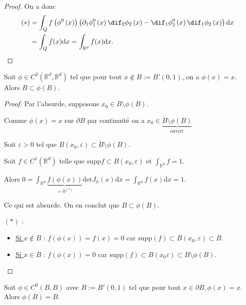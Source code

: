 \begin{proof}
	On a donc 
	\begin{align*}
		\left( * \right) &= \int_Q f\left( \phi^0 \left(x  \right) \right) \left( \partial_1 \phi_{1}^0\left( x \right) \dif_2 \phi_2 \left( x \right) - \dif_1 \phi^0_2\left(x  \right) \dif_1 \phi_2 \left( x \right) \right) \mathrm{d} x\\
		&= \int_Q f(x) \mathrm{d} x = \int_{\mathbb{R}^d}f(x) \dd x 
	.\end{align*}
\end{proof} 
\begin{corollaire}
	Soit $\phi \in C^2 \left( \mathbb{R}^d, \mathbb{R}^d \right) $ tel que pour tout $x \not\in B := B'\left( 0,1 \right)$, on a $\phi\left( x \right) =x$. Alors $B \subset \phi\left( B \right) $.
\end{corollaire}

\begin{proof}
		Par l'absurde, supposons $x_0 \in B \setminus \phi\left( B \right) $.

Comme $ \phi \left( x \right) =x$ sur $ \partial B$ par continuité on a $x_0 \in \underbrace{\mathring{B} \setminus \phi(B)}_{\text{ouvert}}$

Soit $\varepsilon>0$ tel que $B\left( x_0, \varepsilon \right) \subset \mathring{B}\setminus \phi\left( B \right) .$

Soit $f \in C^1\left( \mathbb{R}^d  \right) $ telle que $\text{supp} f \subset B\left( x_0, \varepsilon \right) $ et $\int_{\mathbb{R}^d }f =1$.

Alors $0=\int_{\mathbb{R}^d } \underbrace{ f\left( \phi\left( x \right)  \right) }_{=0^{(*)}} \text{det} J_{\phi}\left( x  \right) \text{d} x = \int_{\mathbb{R}^d } f\left( x \right) \text{d} x = 1$.

Ce qui est absurde. On en conclut que $B \subset  \phi\left( B \right)$.

$(*)$ :  \begin{itemize}
    \item \underline{Si $x \not\in B$} : $f\left( \phi\left( x \right)  \right) = f(x) = 0$ car  $\text{supp} (f) \subset B\left( x_0, \varepsilon \right) \subset B$. 
    \item  \underline{Si $x \in B$} : $f\left( \phi\left( x \right)  \right) =0$ car $\text{supp} (f) \subset  B\left( x_0 \varepsilon \right) \subset B \setminus \phi\left( B \right) $.
\end{itemize}


\end{proof}
\begin{corollaire}

	Soit $\phi \in C^0\left(B,B  \right) $ avec $B := B'\left( 0,1 \right) $ tel que  pour tout $x \in  \partial B ,\phi\left( x \right) =x$. Alors $ \phi\left( B \right) =B$.
\end{corollaire}
